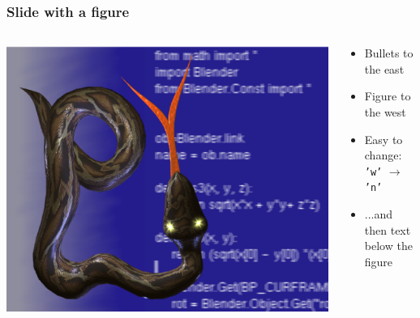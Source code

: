 \documentclass{beamer}
\begin{document}
\begin{frame}
\frametitle{Slide with a figure}


\begin{columns}

\centerline{\includegraphics[width=1.000000\linewidth,keepaspectratio]{python1.ps}}

\begin{block}

\begin{itemize}
\item Bullets to the east
\item Figure to the west
\item Easy to change: \texttt{'w'} $\rightarrow$ \texttt{'n'}
\item ...and then text below the figure
\end{itemize}

\end{block}

\end{columns}

\end{frame}
\end{document}
